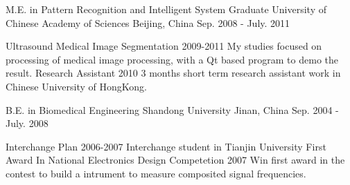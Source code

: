 

\begin{cventries}

  \cventry
   {M.E. in Pattern Recognition and Intelligent System}
   {Graduate University of Chinese Academy of Sciences}
   {Beijing, China}
   {Sep. 2008 - July. 2011}
   {
     \begin{cvsubentries}
       \cvsubentry
         {}
         {Ultrasound Medical Image Segmentation}
         {2009-2011}
         {My studies focused on processing of medical image processing, with a Qt based program to demo the result.}
       \cvsubentry
         {}
         {Research Assistant}
         {2010}
         {3 months short term research assistant work in Chinese University of HongKong.}
     \end{cvsubentries}
   }
   
  \cventry
    {B.E. in Biomedical Engineering} %
    {Shandong University} %
    {Jinan, China} %
    {Sep. 2004 - July. 2008} %
    {
      \begin{cvsubentries} %
        \cvsubentry
          {}
          {Interchange Plan}
          {2006-2007}
          {Interchange student in Tianjin University}
        \cvsubentry
          {}
          {First Award In National Electronics Design Competetion}
          {2007}
          {Win first award in the contest to build a intrument to measure composited signal frequencies.}
      \end{cvsubentries}
    }

\end{cventries}
